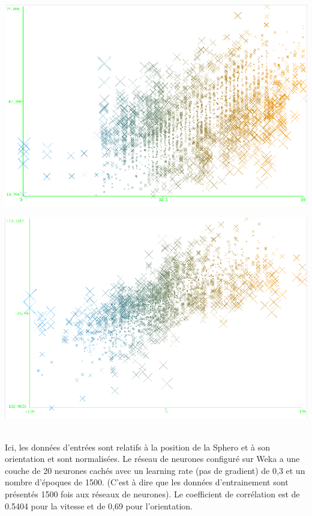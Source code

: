 \begin{minipage}[c]{\mpwekawidth}
 \includegraphics[width=\h]{../figures/speed121314N1500H20.png}
\end{minipage}
\begin{minipage}[c]{\mpwekawidth}
 \includegraphics[width=\textwidth]{../figures/121314N1500H20.png}
\end{minipage}
\\
Ici, les données d'entrées sont relatifs à la position de la Sphero et à son orientation et sont normalisées.
Le réseau de neurones configuré sur Weka a une couche de 20 neurones cachés avec un learning rate (pas de gradient) de 0,3 et un nombre d'époques de 1500.
(C'est à dire que les données d'entrainement sont présentés 1500 fois aux réseaux de neurones).
Le coefficient de corrélation est de 0.5404 pour la vitesse et de 0,69 pour l'orientation.

